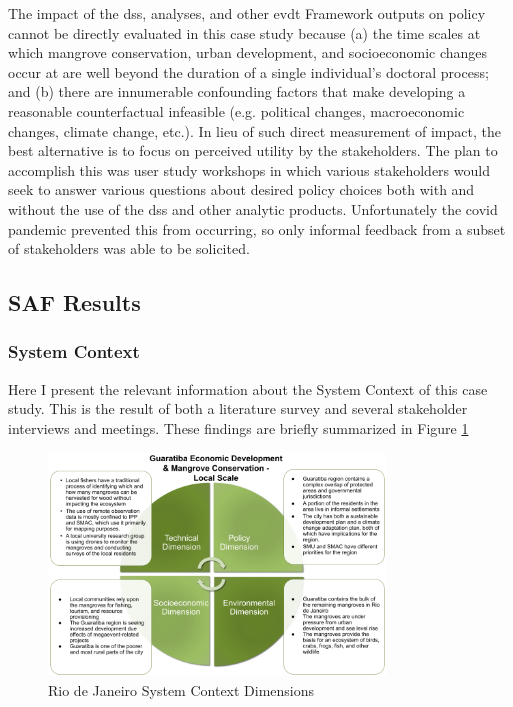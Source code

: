 The impact of the \ac{dss}, analyses, and other \ac{evdt} Framework outputs on policy cannot be directly evaluated in this case study because (a) the time scales at which mangrove conservation, urban development, and socioeconomic changes occur at are well beyond the duration of a single individual's doctoral process; and (b) there are innumerable confounding factors that make developing a reasonable counterfactual infeasible (e.g. political changes, macroeconomic changes, climate change, etc.). In lieu of such direct measurement of impact, the best alternative is to focus on perceived utility by the stakeholders. The plan to accomplish this was user study workshops in which various stakeholders would seek to answer various questions about desired policy choices both with and without the use of the \ac{dss} and other analytic products. Unfortunately the \ac{covid} pandemic prevented this from occurring, so only informal feedback from a subset of stakeholders was able to be solicited.


\subsection{SAF Results} \label{sec:rio-saf-results}

\subsubsection{System Context}

Here I present the relevant information about the System Context of this case study. This is the result of both a literature survey and several stakeholder interviews and meetings. These findings are briefly summarized in Figure \ref{fig:dimensions_rio}

\begin{figure}[H] 
\centering
\includegraphics[width=0.8\textwidth]{Figures/chap4/dimensions_rio.png}
\caption[Rio de Janeiro System Context Dimensions]{Rio de Janeiro System Context Dimensions}
\label{fig:dimensions_rio}
\end{figure}

